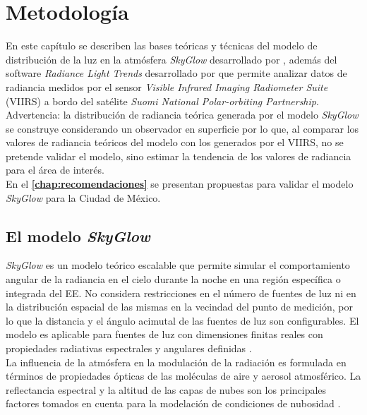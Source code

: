 \chapter{Metodología}
\label{chap:metodologia}

En este capítulo se describen las bases teóricas y técnicas del modelo de distribución de la luz en la atmósfera \textit{SkyGlow} desarrollado por \cite{Kocifaj2007}, además del software \textit{Radiance Light Trends} desarrollado por \cite{RLT2019} que permite analizar datos de radiancia medidos por el sensor \textit{Visible Infrared Imaging Radiometer Suite} (VIIRS) a bordo del satélite \textit{Suomi National Polar-orbiting Partnership}.\\

Advertencia: la distribución de radiancia teórica generada por el modelo \textit{SkyGlow} se construye considerando un observador en superficie por lo que, al comparar los valores de radiancia teóricos del modelo con los generados por el VIIRS, no se pretende validar el modelo, sino estimar la tendencia de los valores de radiancia para el área de interés.\\

En el \textbf{\autoref{chap:recomendaciones}} se presentan propuestas para validar el modelo \textit{SkyGlow} para la Ciudad de México.\\ 

\section{El modelo \textit{SkyGlow}}
\label{sec:modeloskyglow}


\textit{SkyGlow} es un modelo teórico escalable que permite simular el comportamiento angular de la radiancia en el cielo durante la noche en una región específica o integrada del EE. No considera restricciones en el número de fuentes de luz ni en la distribución espacial de las mismas en la vecindad del punto de medición, por lo que la distancia y el ángulo acimutal de las fuentes de luz son configurables. El modelo es aplicable para fuentes de luz con dimensiones finitas reales con propiedades radiativas espectrales y angulares definidas \citep{Kocifaj2007}.\\ 

La influencia de la atmósfera en la modulación de la radiación es formulada en términos de propiedades ópticas de las moléculas de aire y aerosol atmosférico. La reflectancia espectral y la altitud de las capas de nubes son los principales factores tomados en cuenta para la modelación de condiciones de nubosidad \citep{Kocifaj2007,Solano2014}.\\ 

